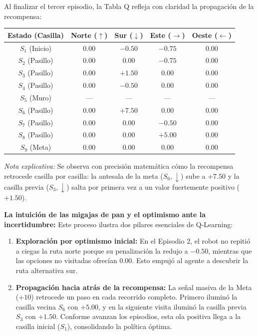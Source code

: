 \begin{calculomanual}
\pagebreak
Al finalizar el tercer episodio, la Tabla Q refleja con claridad la propagación de la recompensa:

\begin{center}
\small
\begin{tabular}{ccccc}
  \toprule
  \textbf{Estado (Casilla)} & \textbf{Norte ($\uparrow$)} & \textbf{Sur ($\downarrow$)} & \textbf{Este ($\rightarrow$)} & \textbf{Oeste ($\leftarrow$)} \\
  \midrule
  $S_1$ (Inicio)  & $0.00$ & $-0.50$          & $\mathbf{-0.75}$ & $0.00$ \\
  $S_2$ (Pasillo) & $0.00$ & $0.00$          & $\mathbf{-0.75}$ & $0.00$ \\
  $S_3$ (Pasillo) & $0.00$ & $\mathbf{+1.50}$ & $0.00$          & $0.00$ \\
  $S_4$ (Pasillo) & $0.00$ & $-0.50$          & $0.00$          & $0.00$ \\
  $S_5$ (Muro)    & ---    & ---             & ---             & ---    \\
  $S_6$ (Pasillo) & $0.00$ & $\mathbf{+7.50}$ & $0.00$          & $0.00$ \\
  $S_7$ (Pasillo) & $0.00$ & $0.00$          & $-0.50$          & $0.00$ \\
  $S_8$ (Pasillo) & $0.00$ & $0.00$          & $+5.00$          & $0.00$ \\
  $S_9$ (Meta)    & $0.00$ & $0.00$          & $0.00$          & $0.00$ \\
  \bottomrule
\end{tabular}
\end{center}
\textit{Nota explicativa:} Se observa con precisión matemática cómo la recompensa retrocede casilla por casilla: la antesala de la meta ($S_6, \downarrow$) sube a $+7.50$ y la casilla previa ($S_3, \downarrow$) salta por primera vez a un valor fuertemente positivo ($+1.50$).
\end{calculomanual}

\begin{ideaclave}
\textbf{La intuición de las migajas de pan y el optimismo ante la incertidumbre:}
Este proceso ilustra dos pilares esenciales de Q-Learning:
\begin{enumerate}
  \item \textbf{Exploración por optimismo inicial:} En el Episodio 2, el robot no repitió a ciegas la ruta norte porque su penalización la redujo a $-0.50$, mientras que las opciones no visitadas ofrecían $0.00$. Esto empujó al agente a descubrir la ruta alternativa sur.
  \item \textbf{Propagación hacia atrás de la recompensa:} La señal masiva de la Meta ($+10$) retrocede un paso en cada recorrido completo. Primero iluminó la casilla vecina $S_6$ con $+5.00$, y en la siguiente visita iluminó la casilla previa $S_3$ con $+1.50$. Conforme avanzan los episodios, esta ola positiva llega a la casilla inicial ($S_1$), consolidando la política óptima.
\end{enumerate}
\end{ideaclave}

